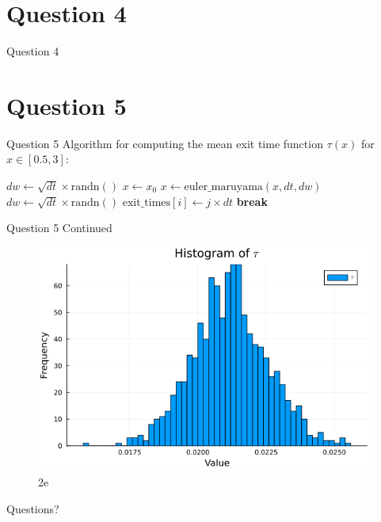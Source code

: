 \documentclass[compress,12pt]{beamer}
\begin{document}
\section{Question 4}
\begin{frame}{Question 4}
\end{frame}

\section{Question 5}
\begin{frame}{Question 5}
Algorithm for computing the mean exit time function $\tau(x)$ for $x \in [0.5, 3]$:
\begin{algorithmic}
            \State $dw \gets \sqrt{dt} \times \text{randn}()$
            \State $x \gets x_0$
                  \State $x \gets \text{euler\_maruyama}(x, dt, dw)$
                  \State $dw \gets \sqrt{dt} \times \text{randn}()$
                        \State $\text{exit\_times}[i] \gets j \times dt$
                        \State \textbf{break}
                  \EndIf
            \EndFor
      \EndFor
\end{algorithmic}
\end{frame}

\begin{frame}{Question 5 Continued}
\begin{figure}[H]
            \centering
            \includegraphics[scale=0.5]{imgs/5.png}
            \caption{2e}
            \label{fig:2e}
      \end{figure}

\end{frame}

\End
\begin{frame}
      \centering
      Questions?
\end{frame}
\end{document}
